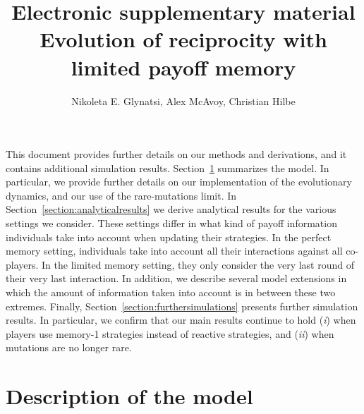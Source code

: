 \documentclass[11pt]{article}
\title{{ \sffamily \LARGE Electronic supplementary material}\\{\bf \sffamily \LARGE Evolution of reciprocity with limited payoff memory}}
\date{}
\author{Nikoleta E. Glynatsi, Alex McAvoy,  Christian Hilbe}
\theoremstyle{plainCl1}
\theoremstyle{plainCl2}
\begin{document}
\maketitle



\noindent
This document provides further details on our methods and derivations, and it contains additional simulation results. 
Section~\ref{section:model} summarizes the model. 
In particular, we provide further details on our implementation of the evolutionary dynamics, and our use of the rare-mutations limit. 
In Section~\ref{section:analyticalresults} we derive analytical results for the various settings we consider.
These settings differ in what kind of payoff information individuals take into account when updating their strategies. 
In the perfect memory setting, individuals take into account all their interactions against all co-players.
In the limited memory setting, they only consider the very last round of their very last interaction.  
In addition, we describe several model extensions in which the amount of information taken into account is in between these two extremes. 
Finally, Section~\ref{section:furthersimulations} presents further simulation results. 
In particular, we confirm that our main results continue to hold ({\it i}) when players use memory-1 strategies instead of reactive strategies, and  ({\it ii}) when mutations are no longer rare.




\section{Description of the model}\label{section:model}

\end{document}
